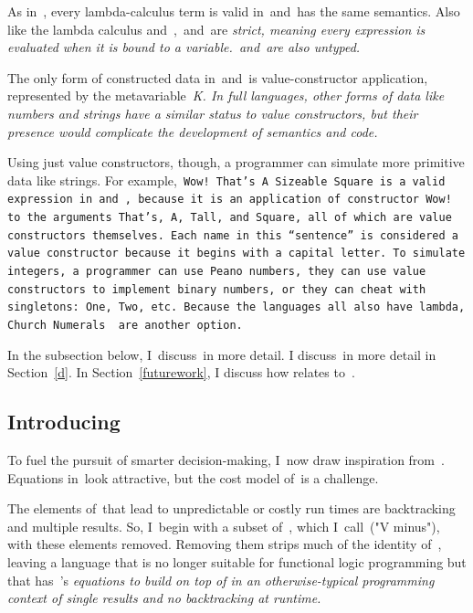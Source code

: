 \documentclass[manuscript,screen 12pt, nonacm]{acmart}
\begin{document}
    As in~\VC, every lambda-calculus term is valid in~\VMinus and~\D has the
    same semantics. Also like the lambda calculus and~\VC,~\VMinus and~\D are
    \it{strict}, meaning every expression is evaluated when it is bound to a
    variable.~\VMinus and~\D are also untyped. 
    
    The only form of constructed data in~\VMinus and~\D is value-constructor
    application, represented by the metavariable~\it{K}. In full languages,
    other forms of data like numbers and strings have a similar status to value
    constructors, but their presence would complicate the development of
    semantics and code. 
    
    Using just value constructors, though, a programmer can simulate more
    primitive data like strings. For example,~\tt{Wow! That's A Sizeable Square} is
    a valid expression in~\VMinus and~\D, because it is an application of
    constructor~\tt{Wow!} to the arguments~\tt{That's},~\tt{A},~\tt{Tall}, and
    \tt{Square}, all of which are value constructors themselves. Each name in
    this “sentence” is considered a value constructor because it begins with a
    capital letter. To simulate integers, a programmer can use Peano numbers,
    they can use value constructors to implement binary numbers, or they can
    cheat with singletons:~\tt{One},~\tt{Two}, etc. Because the languages all
    also have lambda, Church Numerals~\citep{church1985calculi} are another
    option. 

    In the subsection below, I~discuss~\VMinus in more detail. I discuss~\D in
    more detail in Section~\ref{d}. In Section~\ref{futurework}, I discuss how
    \VMinus relates to~\VC. 

\subsection{Introducing~\VMinus}
\label{vminus}

        To fuel the pursuit of smarter decision-making, I~now draw inspiration
        from~\VC. Equations in~\VC look attractive, but the cost model of~\VC is
        a challenge. 
        
        The elements of~\VC that lead to unpredictable or costly run times are
        backtracking and multiple results. So, I~begin with a subset of~\VC,
        which I~call~\VMinus ("V minus"), with these elements removed. Removing
        them strips much of the identity of~\VC, leaving a language that is no
        longer suitable for functional logic programming but that has~\VC's
        \it{equations} to build on top of in an otherwise-typical programming
        context of single results and no backtracking at runtime. 
\end{document}
